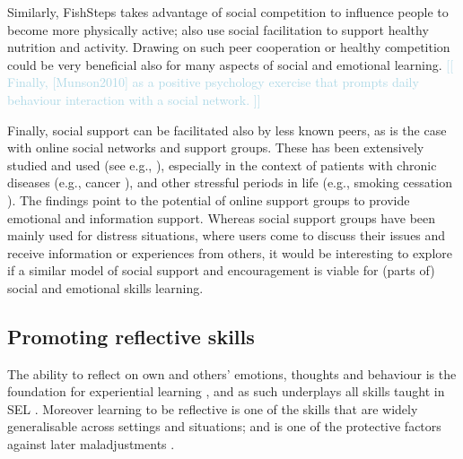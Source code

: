 \documentclass[prodmode,acmtochi]{acmsmall}
\newcommand{\todo}[1]{\textrm{\textrm{\textcolor{LightBlue}{[[#1]]} } } }
\begin{document}
%
Similarly, FishSteps \cite{Lin2006} takes advantage of social competition to
influence people to become more physically active;  also use social facilitation to support healthy nutrition and activity. 
Drawing on such peer cooperation or healthy competition could be very beneficial also for many aspects of social and emotional learning.  
\todo{ Finally, [Munson2010] as a positive psychology exercise that prompts daily behaviour interaction with a social network. }

Finally, social support can be facilitated also by less known peers, as is the case with online social networks and support groups. These has been extensively studied and used (see e.g., \cite{Barak2008,Newman2011}), especially in the context of patients with chronic diseases (e.g., cancer \cite{Skeels2010}), and other stressful periods in life (e.g., smoking cessation \cite{Ploderer2013}). The findings point to the potential of online support groups to provide emotional and information support.  %
Whereas social support groups have been mainly used for distress situations, where users come to discuss their issues and receive information or experiences from others, it would be interesting to explore if a similar model of social support and encouragement is viable for (parts of) social and emotional skills learning. %




                 

\subsection{Promoting reflective skills}
\label{sec:feedback}
The ability to reflect on own and others' emotions, thoughts and behaviour is the foundation for experiential learning \cite{Moon}, and as such underplays all skills taught in SEL \cite{Cohen2001,Cohen2006,Pasi2001,Zins,Maree,Paths}. %
Moreover learning to be reflective is one of the skills that are widely generalisable across settings and situations; and is one of the protective factors against later maladjustments \cite{Zins}.
\end{document}

